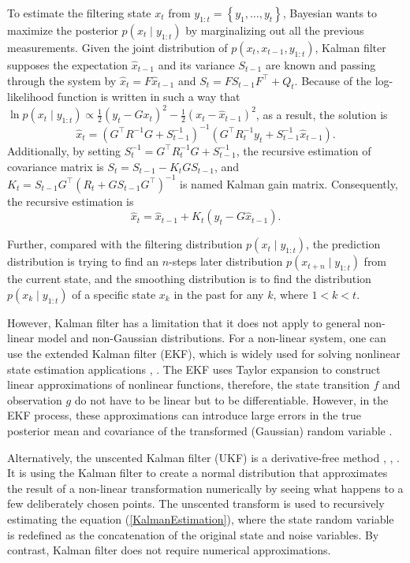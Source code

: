 To estimate the filtering state $x_t$ from $y_{1:t}=\left\lbrace y_1,\ldots,y_t\right\rbrace$, Bayesian wants to maximize the posterior $p(x_t\mid y_{1:t})$ by marginalizing out all the previous measurements. Given the joint distribution of $p(x_t,x_{t-1},y_{1:t})$, Kalman filter supposes the expectation $\hat{x}_{t-1}$ and its variance $S_{t-1}$ are known and passing through the system by $\hat{x}_t=F\hat{x}_{t-1}$ and $S_t=FS_{t-1}F^\top + Q_t$. Because of the log-likelihood function is written in such a way that
$\ln p(x_t\mid y_{1:t}) \propto \frac{1}{2}(y_t-Gx_t)^2-\frac{1}{2}(x_t-\hat{x}_{t-1})^2$,
as a result, the solution is 
\begin{equation*}
\hat{x}_t = \left(G^\top R^{-1}G+S_{t-1}^{-1}\right)^{-1}\left( G^\top R_t^{-1}y_t+S_{t-1}^{-1}\hat{x}_{t-1} \right).
\end{equation*}
Additionally, by setting $S_t^{-1} = G^\top R_t^{-1}G+S_{t-1}^{-1}$, the recursive estimation of covariance matrix is $S_t = S_{t-1} - K_t GS_{t-1}$, 
and $K_t = S_{t-1} G^\top (R_t +GS_{t-1}G^\top)^{-1}$ is named Kalman gain matrix. Consequently, the recursive estimation is 
\begin{equation}\label{KalmanEstimation}
\hat{x}_t = \hat{x}_{t-1}+K_t(y_t-G\hat{x}_{t-1}).
\end{equation}

Further, compared with the filtering distribution $p(x_t\mid y_{1:t})$, the prediction distribution is trying to find an $n$-steps later distribution $p(x_{t+n}\mid y_{1:t})$ from the current state, and the smoothing distribution is to find the distribution $p(x_k\mid y_{1:t})$ of a specific state $x_k$ in the past for any $k$, where $1<k<t$. 

However, Kalman filter has a limitation that it does not apply to general non-linear model and non-Gaussian distributions. For a non-linear system, one can use the extended Kalman filter (EKF), which is widely used for solving nonlinear state estimation applications \cite{gelb1974applied}, \cite{bar1993estimation}. The EKF uses Taylor expansion to construct linear approximations of nonlinear functions, therefore, the state transition $f$ and observation $g$ do not have to be linear but to be differentiable. However, in the EKF process, these approximations can introduce large errors in the true posterior mean and covariance of the transformed (Gaussian) random variable \cite{wan2000unscented}. 

Alternatively, the unscented Kalman filter (UKF) is a derivative-free method \cite{julier1997new}, \cite{wan2000unscented}, \cite{gyorgy2014unscented}. It is using the Kalman filter to create a normal distribution that approximates the result of a non-linear transformation numerically by seeing what happens to a few deliberately chosen points. The unscented transform is used to recursively estimating the equation (\ref{KalmanEstimation}), where the state random variable is redefined as the concatenation of the original state and noise variables. By contrast, Kalman filter does not require numerical approximations. 

